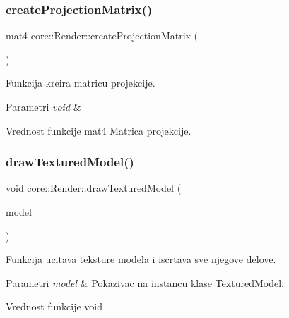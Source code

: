 \subsubsection{\texorpdfstring{create\+Projection\+Matrix()}{createProjectionMatrix()}}
{\footnotesize\ttfamily mat4 core\+::\+Render\+::create\+Projection\+Matrix (\begin{DoxyParamCaption}{ }\end{DoxyParamCaption})\hspace{0.3cm}{\ttfamily [private]}}



Funkcija kreira matricu projekcije. 


\begin{DoxyParams}{Parametri}
{\em void} & \\
\hline
\end{DoxyParams}
\begin{DoxyReturn}{Vrednost funkcije}
mat4 Matrica projekcije. 
\end{DoxyReturn}
\mbox{\label{classcore_1_1Render_aedd0d54abe302da59731759a5d456713}} 
\subsubsection{\texorpdfstring{draw\+Textured\+Model()}{drawTexturedModel()}}
{\footnotesize\ttfamily void core\+::\+Render\+::draw\+Textured\+Model (\begin{DoxyParamCaption}\item[{\hyperlink{classmodel_1_1TexturedModel}{Textured\+Model} $\ast$}]{model }\end{DoxyParamCaption})}



Funkcija ucitava teksture modela i iscrtava sve njegove delove. 


\begin{DoxyParams}{Parametri}
{\em model} & Pokazivac na instancu klase Textured\+Model. \\
\hline
\end{DoxyParams}
\begin{DoxyReturn}{Vrednost funkcije}
void 
\end{DoxyReturn}
\mbox{\label{classcore_1_1Render_aeb298077579c71d8b4407dacbed75302}} 
